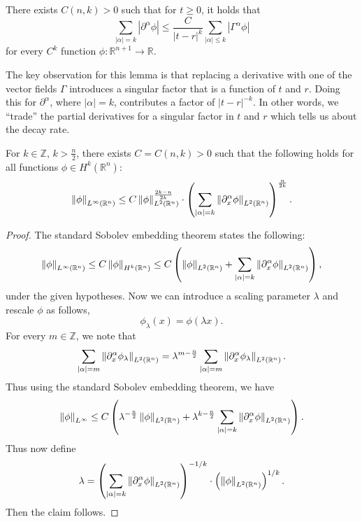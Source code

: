 \documentclass{article}
\begin{document}
\begin{lemma}
	There exists $C(n,k) > 0$ such that for $t \geq 0$, it holds that 
	\begin{equation*}
		\sum_{|\alpha| = k}|\partial^{\alpha}\phi| \leq \frac{C}{|t - r|^{k}}\sum_{|\alpha|\leq k}|\Gamma^{\alpha}\phi| 
	\end{equation*}
	for every $C^{k}$ function $\phi: \mathbb{R}^{n + 1} \to \mathbb{R}$. 
\end{lemma} 
The key observation for this lemma is that replacing a derivative with one of the vector fields $\Gamma$ introduces a singular factor that is a function of $t$ and $r$. Doing this for $\partial^{\alpha}$, where $|\alpha| = k$, contributes a factor of $|t - r|^{-k}$. In other words, we ``trade'' the partial derivatives for a singular factor in $t$ and $r$ which tells us about the decay rate. 
\begin{lemma}
	For $k \in \mathbb{Z}$, $k >\frac{n}{2}$, there exists $C = C(n,k) > 0$ such that the following holds for all functions $\phi \in H^{k}(\mathbb{R}^{n})$: 
	\begin{equation}
		\left\Vert \phi \right\Vert_{L^{\infty}(\mathbb{R}^{n})} \leq C\left\Vert \phi \right\Vert_{L^{2}(\mathbb{R}^{n})}^{\frac{2k - n}{2k}}\cdot \left(\sum_{|\alpha| = k}\left\Vert \partial_{x}^{\alpha}\phi \right\Vert_{L^{2}(\mathbb{R}^{n})}\right)^{\frac{n}{2k}}. 
	\end{equation}
\end{lemma} 
\begin{proof}
	The standard Sobolev embedding theorem states the following: 
	\begin{equation*}
		\left\Vert \phi \right\Vert_{L^{\infty}(\mathbb{R}^{n})} \leq C\left\Vert \phi \right\Vert_{H^{k}(\mathbb{R}^{n})} \leq C\left(\left\Vert \phi \right\Vert_{L^{2}(\mathbb{R}^{n})} + \sum_{|\alpha| = k}\left\Vert \partial_{x}^{\alpha}\phi \right\Vert_{L^{2}(\mathbb{R}^{n})}\right), 
	\end{equation*} 
	under the given hypotheses. Now we can introduce a scaling parameter $\lambda$ and rescale $\phi$ as follows, 
	\begin{equation*}
		\phi_{\lambda}(x) = \phi(\lambda x). 
	\end{equation*}
	For every $m \in \mathbb{Z}$, we note that 
	\begin{equation*}
		\sum_{|\alpha|= m}\left\Vert \partial_{x}^{\alpha}\phi_{\lambda} \right\Vert_{L^{2}(\mathbb{R}^{n})} = \lambda^{m - \frac{n}{2}}\sum_{|\alpha| = m}\left\Vert \partial_{x}^{\alpha}\phi_{\lambda} \right\Vert_{L^{2}(\mathbb{R}^{n})}. 
	\end{equation*}
	Thus using the standard Sobolev embedding theorem, we have 
	\begin{equation*}
		\left\Vert \phi \right\Vert_{L^{\infty}} \leq C\left(\lambda^{-\frac{n}{2}}\left\Vert \phi \right\Vert_{L^{2}(\mathbb{R}^{n})} + \lambda^{k - \frac{n}{2}}\sum_{|\alpha| = k}\left\Vert \partial_{x}^{\alpha}\phi \right\Vert_{L^{2}(\mathbb{R}^{n})}\right). 
	\end{equation*}
	Thus now define
	\begin{equation*}
		\lambda = \left(\sum_{|\alpha| = k}\left\Vert \partial_{x}^{\alpha}\phi \right\Vert_{L^{2}(\mathbb{R}^{n})}\right)^{-1/k}\cdot \left(\left\Vert \phi \right\Vert_{L^{2}(\mathbb{R}^{n})}\right)^{1/k}. 
	\end{equation*}
	Then the claim follows. 
\end{proof} 
\end{document}
